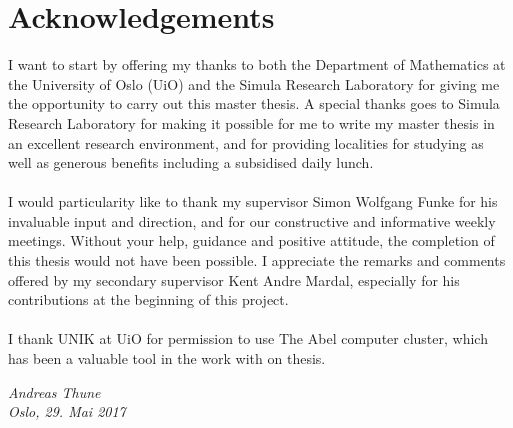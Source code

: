 \chapter*{Acknowledgements}
I want to start by offering my thanks to both the Department of Mathematics at the University of Oslo (UiO) and the Simula Research Laboratory for giving me the opportunity to carry out this master thesis. A special thanks goes to Simula Research Laboratory for making it possible for me to write my master thesis in an excellent research environment, and for providing localities for studying as well as generous benefits including a subsidised daily lunch.
\\
\\
I would particularity like to thank my supervisor Simon Wolfgang Funke for his invaluable input and direction, and for our constructive and informative weekly meetings. Without your help, guidance and positive attitude, the completion of this thesis would not have been possible. I appreciate the remarks and comments offered by my secondary supervisor Kent Andre Mardal, especially for his contributions at the beginning of this project.
\\
\\
I thank UNIK at UiO for permission to use The Abel computer cluster, which has been a valuable tool in the work with on thesis.
\begin{flushright}
\textit{
Andreas Thune
\\
Oslo, 29. Mai 2017}
\end{flushright}